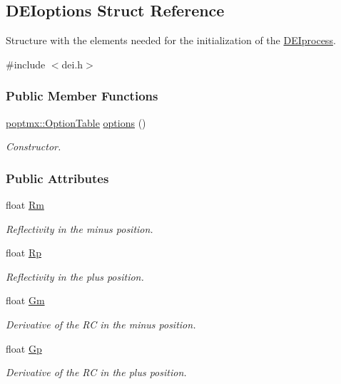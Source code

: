 \hypertarget{structDEIoptions}{
\subsection{DEIoptions Struct Reference}
\label{structDEIoptions}
}


Structure with the elements needed for the initialization of the \hyperlink{classDEIprocess}{DEIprocess}.  




{\ttfamily \#include $<$dei.h$>$}

\subsubsection*{Public Member Functions}
\begin{DoxyCompactItemize}
\item 
\hyperlink{classpoptmx_1_1OptionTable}{poptmx::OptionTable} \hyperlink{structDEIoptions_a18d72090712d89efa6c1be850f2a48e7}{options} ()
\begin{DoxyCompactList}\small\item\em Constructor. \item\end{DoxyCompactList}\end{DoxyCompactItemize}
\subsubsection*{Public Attributes}
\begin{DoxyCompactItemize}
\item 
float \hyperlink{structDEIoptions_a420f0a69a13203ebf2f2b3dc3429e5b5}{Rm}
\begin{DoxyCompactList}\small\item\em Reflectivity in the minus position. \item\end{DoxyCompactList}\item 
float \hyperlink{structDEIoptions_a3229197ff2c66b06838381221d80d8ce}{Rp}
\begin{DoxyCompactList}\small\item\em Reflectivity in the plus position. \item\end{DoxyCompactList}\item 
float \hyperlink{structDEIoptions_aadde1147c66023ef3f76b9fd8fa18ea1}{Gm}
\begin{DoxyCompactList}\small\item\em Derivative of the RC in the minus position. \item\end{DoxyCompactList}\item 
float \hyperlink{structDEIoptions_a295b3d9567d0ec3bf1a76f7bcbef7506}{Gp}
\begin{DoxyCompactList}\small\item\em Derivative of the RC in the plus position. \item\end{DoxyCompactList}\end{DoxyCompactItemize}


